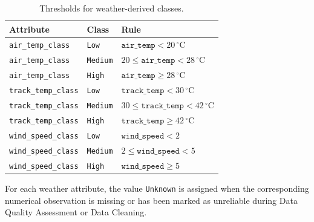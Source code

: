 \documentclass[11pt,a4paper]{article}
\begin{document}
	\begin{table}[H]
		\centering
		\caption{Thresholds for weather-derived classes.}
		\begin{tabularx}{\linewidth}{p{4cm}p{3cm}X}
			\toprule
			\textbf{Attribute} & \textbf{Class} & \textbf{Rule} \\
			\midrule
			
			\texttt{air\_temp\_class}
			& \texttt{Low}
			& $\texttt{air\_temp} < 20\,^{\circ}\mathrm{C}$ \\
			
			\texttt{air\_temp\_class}
			& \texttt{Medium}
			& $20 \leq \texttt{air\_temp} < 28\,^{\circ}\mathrm{C}$ \\
			
			\texttt{air\_temp\_class}
			& \texttt{High}
			& $\texttt{air\_temp} \geq 28\,^{\circ}\mathrm{C}$ \\
			
			\midrule
			
			\texttt{track\_temp\_class}
			& \texttt{Low}
			& $\texttt{track\_temp} < 30\,^{\circ}\mathrm{C}$ \\
			
			\texttt{track\_temp\_class}
			& \texttt{Medium}
			& $30 \leq \texttt{track\_temp} < 42\,^{\circ}\mathrm{C}$ \\
			
			\texttt{track\_temp\_class}
			& \texttt{High}
			& $\texttt{track\_temp} \geq 42\,^{\circ}\mathrm{C}$ \\
			
			\midrule
			
			\texttt{wind\_speed\_class}
			& \texttt{Low}
			& $\texttt{wind\_speed} < 2$ \\
			
			\texttt{wind\_speed\_class}
			& \texttt{Medium}
			& $2 \leq \texttt{wind\_speed} < 5$ \\
			
			\texttt{wind\_speed\_class}
			& \texttt{High}
			& $\texttt{wind\_speed} \geq 5$ \\
			
			\bottomrule
		\end{tabularx}
	\end{table}
	
	For each weather attribute, the value \texttt{Unknown} is assigned
	when the corresponding numerical observation is missing or has been
	marked as unreliable during Data Quality Assessment or Data Cleaning.
	
	\newpage
\end{document}
